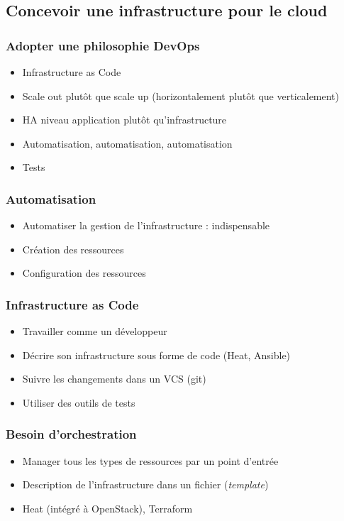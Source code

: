   \subsection[Architecture infra]{Concevoir une infrastructure pour le cloud}

  \begin{frame}
    \frametitle{Adopter une philosophie DevOps}
    \begin{itemize}
      \item Infrastructure as Code
      \item Scale out plutôt que scale up (horizontalement plutôt que verticalement)
      \item HA niveau application plutôt qu'infrastructure
      \item Automatisation, automatisation, automatisation
      \item Tests
    \end{itemize}
  \end{frame}

  \begin{frame}
    \frametitle{Automatisation}
    \begin{itemize}
      \item Automatiser la gestion de l'infrastructure : indispensable
      \item Création des ressources
      \item Configuration des ressources
    \end{itemize}
  \end{frame}

  \begin{frame}
    \frametitle{Infrastructure as Code}
    \begin{itemize}
      \item Travailler comme un développeur
      \item Décrire son infrastructure sous forme de code (Heat, Ansible)
      \item Suivre les changements dans un VCS (git)
      \item Utiliser des outils de tests
    \end{itemize}
  \end{frame}

  \begin{frame}
    \frametitle{Besoin d'orchestration}
    \begin{itemize}
      \item Manager tous les types de ressources par un point d'entrée
      \item Description de l'infrastructure dans un fichier (\textit{template})
      \item Heat (intégré à OpenStack), Terraform
    \end{itemize}
  \end{frame}

